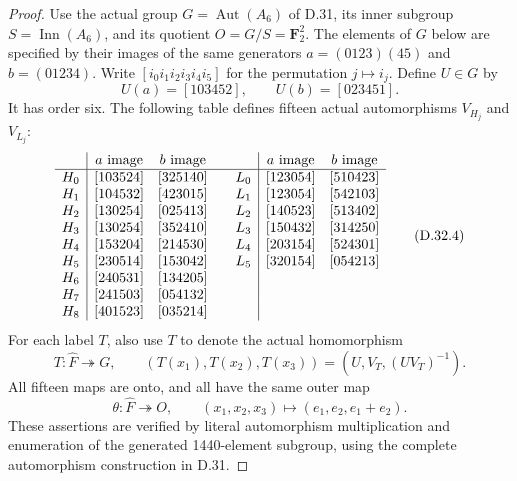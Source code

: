 \begin{proof}
Use the actual group
$G=\operatorname{Aut}(A_6)$ of D.31,
its inner subgroup $S=\operatorname{Inn}(A_6)$,
and its quotient $O=G/S=\mathbf F_2^2$.
The elements of $G$ below are specified
by their images of the same generators
$a=(0123)(45)$ and $b=(01234)$.
Write $[i_0i_1i_2i_3i_4i_5]$ for the
permutation $j\mapsto i_j$.
Define $U\in G$ by
\[
                  U(a)=[103452],\qquad
                  U(b)=[023451].
 \tag{D.32.3}
\]
It has order six.  The following table
defines fifteen actual automorphisms
$V_{H_j}$ and $V_{L_j}$:
\[
\begin{array}{c|cc@{\qquad}c|cc}
 &a\text{ image}&b\text{ image}
 & &a\text{ image}&b\text{ image}\\\hline
 H_0&[103524]&[325140]&L_0&[123054]&[510423]\\
 H_1&[104532]&[423015]&L_1&[123054]&[542103]\\
 H_2&[130254]&[025413]&L_2&[140523]&[513402]\\
 H_3&[130254]&[352410]&L_3&[150432]&[314250]\\
 H_4&[153204]&[214530]&L_4&[203154]&[524301]\\
 H_5&[230514]&[153042]&L_5&[320154]&[054213]\\
 H_6&[240531]&[134205]&&&\\
 H_7&[241503]&[054132]&&&\\
 H_8&[401523]&[035214]&&&
\end{array}
 \tag{D.32.4}
\]
For each label $T$, also use $T$ to
denote the actual homomorphism
\[
 T:\widehat F\twoheadrightarrow G,\qquad
       (T(x_1),T(x_2),T(x_3))
          =(U,V_T,(UV_T)^{-1}).
 \tag{D.32.5}
\]
All fifteen maps are onto, and all
have the same outer map
\[
 \theta:\widehat F\twoheadrightarrow O,\qquad
       (x_1,x_2,x_3)\longmapsto(e_1,e_2,e_1+e_2).
 \tag{D.32.6}
\]
These assertions are verified by
literal automorphism multiplication
and enumeration of the generated
1440-element subgroup, using the
complete automorphism construction
in D.31.


\end{proof}
